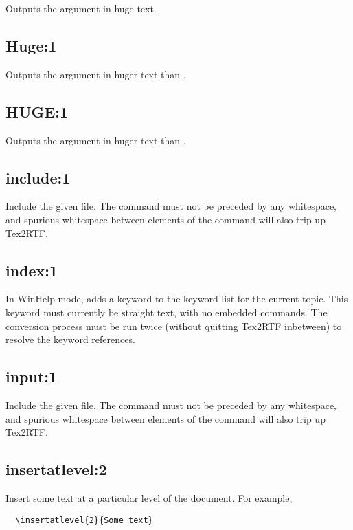 Outputs the argument in huge text.

\subsection*{Huge:1}\label{Huge2}

Outputs the argument in huger text than .

\subsection*{HUGE:1}\label{HUGE3}

Outputs the argument in huger text than .

\subsection*{include:1}\label{include}

Include the given file. The command must not be preceded by any whitespace,
and spurious whitespace between elements of the command will also
trip up Tex2RTF.

\subsection*{index:1}\label{index}

In WinHelp mode, adds a keyword to the keyword list for the current
topic. This keyword must currently be straight text, with no embedded
commands. The conversion process must be run twice (without quitting
Tex2RTF inbetween) to resolve the keyword references.

\subsection*{input:1}\label{input}

Include the given file. The command must not be preceded by any whitespace,
and spurious whitespace between elements of the command will also
trip up Tex2RTF.

\subsection*{insertatlevel:2}\label{insertatlevel}

Insert some text at a particular level of the document. For example,

\begin{verbatim}
  \insertatlevel{2}{Some text}
\end{verbatim}

